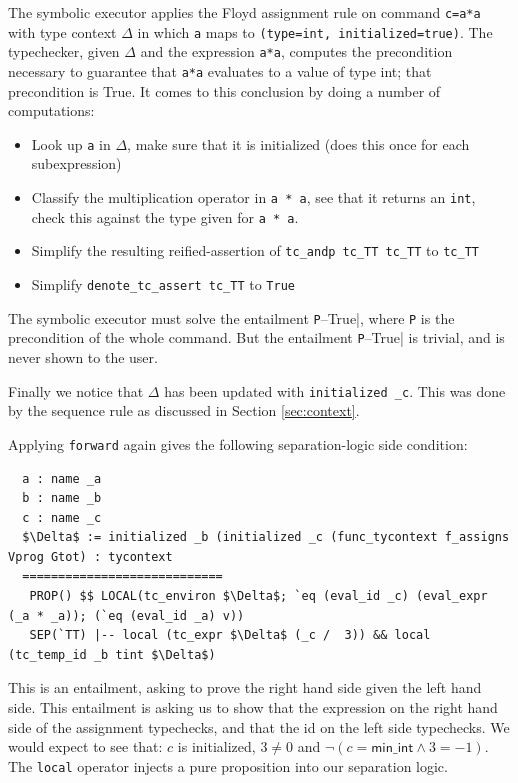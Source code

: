 \documentclass{puthesis}
\begin{document}
The symbolic executor applies the Floyd assignment rule on command
\lstinline|c=a*a| with type context $\Delta$ in which \lstinline|a|
maps to \lstinline|(type=int, initialized=true)|.  The typechecker,
given $\Delta$ and the expression \lstinline|a*a|, computes the
precondition necessary to guarantee that \lstinline|a*a| evaluates to
a value of type int; that precondition is True. It comes to this
conclusion by doing a number of computations:

\begin{itemize}
\item Look up \lstinline|a| in $\Delta$, make sure that it is initialized
  (does this once for each subexpression)
\item Classify the multiplication operator in \lstinline|a * a|, see
  that it returns an \lstinline|int|, check this against the type
  given for \lstinline|a * a|.
\item Simplify the resulting reified-assertion of 
  \lstinline|tc_andp tc_TT tc_TT| to \lstinline|tc_TT|
\item Simplify \lstinline|denote_tc_assert tc_TT| to \lstinline|True|
\end{itemize}

The symbolic executor must solve the entailment \lstinline|P|--True|,
where 
\lstinline|P| is the
precondition of the whole command.  But the entailment
\lstinline|P|--True| is trivial, and is never shown to the user.

Finally we notice that $\Delta$ has been updated with 
\lstinline|initialized _c|. This was done by the sequence rule as discussed in
Section \ref{sec:context}.

Applying \lstinline|forward| again gives 
the following separation-logic side condition: 

\begin{lstlisting}
  a : name _a
  b : name _b
  c : name _c
  $\Delta$ := initialized _b (initialized _c (func_tycontext f_assigns Vprog Gtot) : tycontext 
  ============================
   PROP() $$ LOCAL(tc_environ $\Delta$; `eq (eval_id _c) (eval_expr (_a * _a)); (`eq (eval_id _a) v)) 
   SEP(`TT) |-- local (tc_expr $\Delta$ (_c /  3)) && local (tc_temp_id _b tint $\Delta$)
\end{lstlisting}
\noindent This is an entailment, asking to prove the right hand side
given the left hand side. This entailment is asking us to show that
the expression on the right hand side of the assignment typechecks,
and that the id on the left side typechecks. We would expect to see
that: $c$ is initialized, $3\neq 0$ and $\neg(c=\mathsf{min\_int}
\wedge 3 = -1)$. The \lstinline|local| operator injects a pure
proposition into our separation logic.
\end{document}
